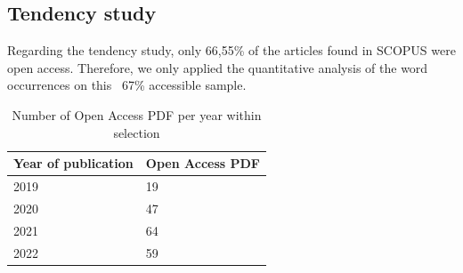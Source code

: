 \documentclass[runningheads]{llncs}
\begin{document}
\subsection{Tendency study}
Regarding the tendency study, only 66,55\% of the articles found in SCOPUS were open access. Therefore, we only applied the quantitative analysis of the word occurrences on this ~67\% accessible sample.
\begin{table}
\caption{Number of Open Access PDF per year within selection}\label{tab2}
\centering
\begin{tabular}{|l|l|}
\hline
Year of publication & Open Access PDF\\
\hline
2019 & 19 \\
2020 & 47 \\
2021 & 64 \\
2022 & 59 \\
\hline
\end{tabular}
\end{table}
\end{document}

